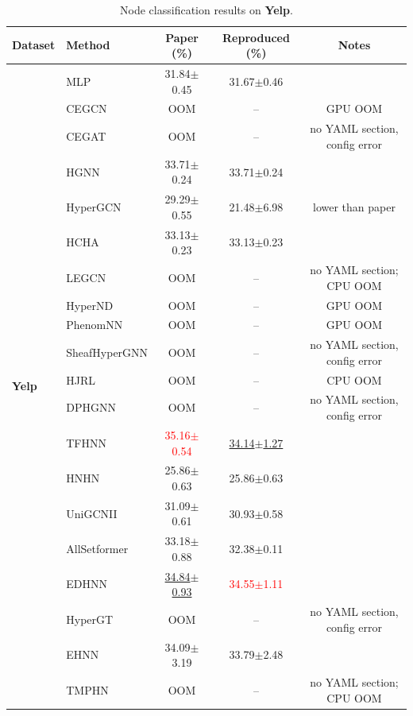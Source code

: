 \documentclass[11pt,a4paper]{article}
\begin{document}
\begin{table}[H]
	\centering\small
	\begin{tabular}{llccc}
		\toprule
		Dataset & Method & Paper (\%) & Reproduced (\%) & Notes \\
		\midrule
		\multirow{20}{*}{\textbf{Yelp}} & MLP               & 31.84$\pm$0.45   & 31.67$\pm$0.46   &  \\
		 & CEGCN             & OOM              & --               & GPU OOM \\
		 & CEGAT             & OOM              & --               & no YAML section, config error \\
		 & HGNN              & 33.71$\pm$0.24   & 33.71$\pm$0.24   &  \\
		 & HyperGCN          & 29.29$\pm$0.55   & 21.48$\pm$6.98   & lower than paper \\
		 & HCHA              & 33.13$\pm$0.23   & 33.13$\pm$0.23   &  \\
		 & LEGCN             & OOM              & --               & no YAML section; CPU OOM \\
		 & HyperND           & OOM              & --               & GPU OOM \\
		 & PhenomNN          & OOM              & --               & GPU OOM \\
		 & SheafHyperGNN     & OOM              & --               & no YAML section, config error \\
		 & HJRL              & OOM              & --               & CPU OOM \\
		 & DPHGNN            & OOM              & --               & no YAML section, config error \\
		 & TFHNN             & \textcolor{red}{35.16$\pm$0.54}   & \underline{34.14$\pm$1.27}   &  \\
		 & HNHN              & 25.86$\pm$0.63   & 25.86$\pm$0.63   &  \\
		 & UniGCNII          & 31.09$\pm$0.61   & 30.93$\pm$0.58   &  \\
		 & AllSetformer      & 33.18$\pm$0.88   & 32.38$\pm$0.11   &  \\
		 & EDHNN             & \underline{34.84$\pm$0.93}   & \textcolor{red}{34.55$\pm$1.11}   &  \\
		 & HyperGT           & OOM              & --               & no YAML section, config error \\
		 & EHNN              & 34.09$\pm$3.19   & 33.79$\pm$2.48   &  \\
		 & TMPHN             & OOM              & --               & no YAML section; CPU OOM \\
		\bottomrule
	\end{tabular}
	\caption{Node classification results on \textbf{Yelp}.}
\end{table}
\end{document}
